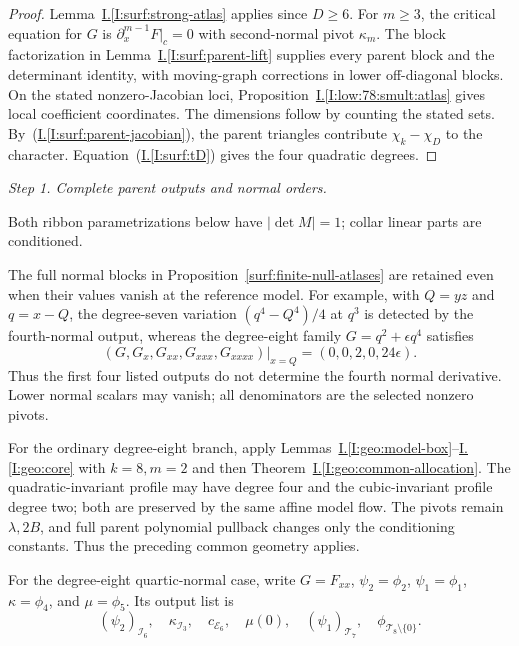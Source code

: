 \documentclass[11pt]{amsart}
\theoremstyle{definition}
\theoremstyle{remark}
\numberwithin{equation}{section}
\newcommand{\partIref}[1]{\hyperref[I:#1]{I.\ref*{I:#1}}}
\newcommand{\partIeqref}[1]{\textup{(\partIref{#1})}}
\begin{document}
\begin{proof}
Lemma~\partIref{surf:strong-atlas} applies since $D\ge6$. For $m\ge3$, the critical equation for $G$ is $\partial_x^{m-1}F|_c=0$ with second-normal pivot $\kappa_m$. The block factorization in Lemma~\partIref{surf:parent-lift} supplies every parent block and the determinant identity, with moving-graph corrections in lower off-diagonal blocks. On the stated nonzero-Jacobian loci, Proposition~\partIref{low:78:smult:atlas} gives local coefficient coordinates. The dimensions follow by counting the stated sets. By~\partIeqref{surf:parent-jacobian}, the parent triangles contribute $\chi_k-\chi_D$ to the character. Equation~\partIeqref{surf:tD} gives the four quadratic degrees. 
\end{proof}

\par\smallskip\noindent\textit{Step 1. Complete parent outputs and normal orders.}\par\nobreak\smallskip

Both ribbon parametrizations below have $|\det M|=1$; collar linear parts are conditioned.

The full normal blocks in Proposition~\ref{surf:finite-null-atlases} are retained even when their values vanish at the reference model. For example, with $Q=yz$ and $q=x-Q$, the degree-seven variation $(q^4-Q^4)/4$ at $q^3$ is detected by the fourth-normal output, whereas the degree-eight family $G=q^2+\epsilon q^4$ satisfies
\[
\left.(G,G_x,G_{xx},G_{xxx},G_{xxxx})\right|_{x=Q}=(0,0,2,0,24\epsilon).
\]
Thus the first four listed outputs do not determine the fourth normal derivative. Lower normal scalars may vanish; all denominators are the selected nonzero pivots.

For the ordinary degree-eight branch, apply Lemmas~\partIref{geo:model-box}--\partIref{geo:core} with $k=8,m=2$ and then Theorem~\partIref{geo:common-allocation}. The quadratic-invariant profile may have degree four and the cubic-invariant profile degree two; both are preserved by the same affine model flow. The pivots remain $\lambda,2B$, and full parent polynomial pullback changes only the conditioning constants. Thus the preceding common geometry applies.

For the degree-eight quartic-normal case, write $G=F_{xx}$, $\psi_2=\phi_2$, $\psi_1=\phi_1$, $\kappa=\phi_4$, and $\mu=\phi_5$. Its output list is
\begin{equation}\label{low:78:d8q:outputs}
(\psi_2)_{\mathcal I_6},\quad \kappa_{\mathcal I_3},\quad c_{\mathcal E_6},\quad \mu(0),\quad (\psi_1)_{\mathcal T_7},\quad \phi_{\mathcal T_8\setminus\{0\}}.
\end{equation}
\end{document}
